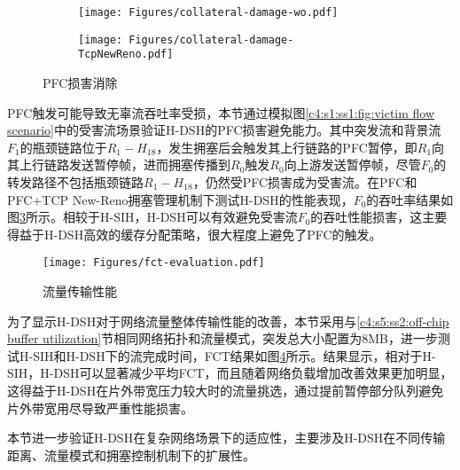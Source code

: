 
\begin{figure}[H]
  \begin{subfigure}[b]{0.49\linewidth}
      \centering
      \texttt{[image: Figures/collateral-damage-wo.pdf]}
      \label{c3:s3:ss4:fig:sub1:w/o cc f0 throughput}
  \end{subfigure}
  \begin{subfigure}[b]{0.49\linewidth}
      \centering
      \texttt{[image: Figures/collateral-damage-TcpNewReno.pdf]}
      \label{c3:s3:ss4:fig:sub1:new reno f0 throughput}
  \end{subfigure}
  \caption{PFC损害消除}
  \label{c3:s3:ss4:fig:throughput damage avoidance}
\end{figure}

PFC触发可能导致无辜流吞吐率受损，本节通过模拟图\ref{c4:s1:ss1:fig:victim flow scenario}中的受害流场景验证H-DSH的PFC损害避免能力。其中突发流和背景流$F_1$的瓶颈链路位于$R_1-H_{18}$，发生拥塞后会触发其上行链路的PFC暂停，即$R_1$向其上行链路发送暂停帧，进而拥塞传播到$R_0$触发$R_0$向上游发送暂停帧，尽管$F_0$的转发路径不包括瓶颈链路$R_1-H_{18}$，仍然受PFC损害成为受害流。在PFC和PFC+TCP New-Reno拥塞管理机制下测试H-DSH的性能表现，$F_0$的吞吐率结果如图\ref{c3:s3:ss4:fig:throughput damage avoidance}所示。相较于H-SIH，H-DSH可以有效避免受害流$F_0$的吞吐性能损害，这主要得益于H-DSH高效的缓存分配策略，很大程度上避免了PFC的触发。

\begin{figure}[H]
  \centering
  \texttt{[image: Figures/fct-evaluation.pdf]}
  \caption{流量传输性能}
  \label{c4:s1:ss1:flow fct}
\end{figure}

\label{c4:s5:ss4:fct improvement}

为了显示H-DSH对于网络流量整体传输性能的改善，本节采用与\ref{c4:s5:ss2:off-chip buffer utilization}节相同网络拓扑和流量模式，突发总大小配置为8MB，进一步测试H-SIH和H-DSH下的流完成时间，FCT结果如图\ref{c4:s1:ss1:flow fct}所示。结果显示，相对于H-SIH，H-DSH可以显著减少平均FCT，而且随着网络负载增加改善效果更加明显，这得益于H-DSH在片外带宽压力较大时的流量挑选，通过提前暂停部分队列避免片外带宽用尽导致严重性能损害。

本节进一步验证H-DSH在复杂网络场景下的适应性，主要涉及H-DSH在不同传输距离、流量模式和拥塞控制机制下的扩展性。

